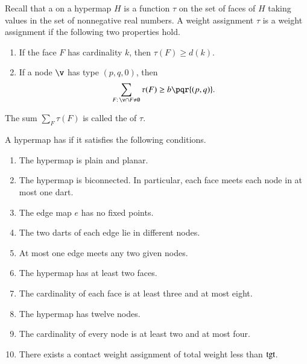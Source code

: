 \documentclass{llncs}
\def\op#1{{\hbox{#1}}}
\begin{document}
%
%
\begin{definition}
%
  Recall that a  
on a hypermap $H$ is a
  function $\tau$ on the set of faces of $H$ taking values in the set
  of nonnegative real numbers. A weight assignment $\tau$
is a 
  weight assignment if the following two properties hold.
%
\begin{enumerate}
\item If the face $F$ has cardinality $k$, then
$\tau(F) \ge d(k)$.
\item If a node $\v$ has type $(p,q,0)$, then
  \[\sum_{F:\,\v\cap F\ne\emptyset} \tau(F) \ge
    b{\pqr{(p,q)}}.\]
\end{enumerate}
The sum $\sum_F \tau(F)$ is called the  of $\tau$.
\end{definition}
%

\begin{definition}
  A hypermap has  if it satisfies the following 
  conditions.
%
%
%
%
%
%
%
%
%
\begin{enumerate}
\item {} The hypermap is plain and planar.
\item {} The hypermap is biconnected.  In particular,
  each face meets each node in at most one dart.
\item {} The edge map $e$ has no fixed points.
\item {} The two darts of each edge lie in different
  nodes.
\item {} At most one edge meets any two given
  nodes.
\item {} The hypermap has at least two faces.
\item {} The cardinality of each face is at least three
  and at most eight.
\item {} The hypermap has twelve nodes.
\item {} The cardinality of every node is at least two  and at most four.
\item {} There exists a contact weight assignment of total
  weight less than $\op{tgt}$.
\end{enumerate}
%
\end{definition}
\end{document}
